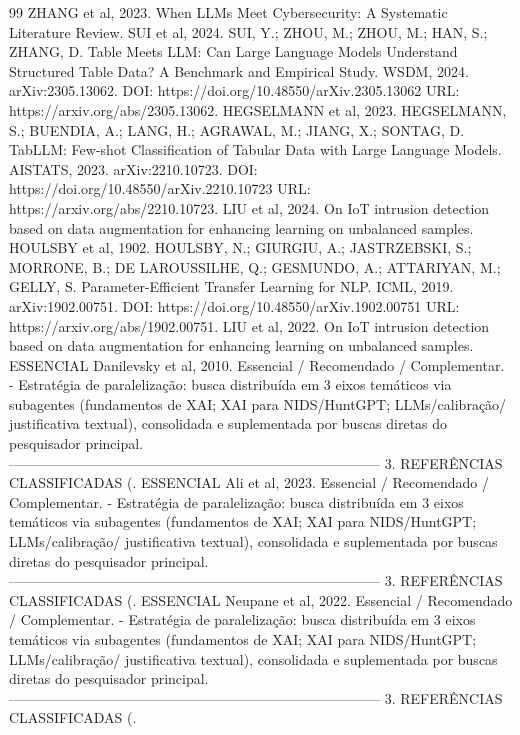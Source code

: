 \documentclass[12pt,a4paper]{article}
\begin{document}
\begin{thebibliography}{99}
 ZHANG et al, 2023. When LLMs Meet Cybersecurity: A Systematic Literature Review.
 SUI et al, 2024. SUI, Y.; ZHOU, M.; ZHOU, M.; HAN, S.; ZHANG, D. Table Meets LLM: Can Large Language Models Understand Structured Table Data? A Benchmark and Empirical Study. WSDM, 2024. arXiv:2305.13062. DOI: https://doi.org/10.48550/arXiv.2305.13062 URL: https://arxiv.org/abs/2305.13062.
 HEGSELMANN et al, 2023. HEGSELMANN, S.; BUENDIA, A.; LANG, H.; AGRAWAL, M.; JIANG, X.; SONTAG, D. TabLLM: Few-shot Classification of Tabular Data with Large Language Models. AISTATS, 2023. arXiv:2210.10723. DOI: https://doi.org/10.48550/arXiv.2210.10723 URL: https://arxiv.org/abs/2210.10723.
 LIU et al, 2024. On IoT intrusion detection based on data augmentation for enhancing learning on unbalanced samples.
 HOULSBY et al, 1902. HOULSBY, N.; GIURGIU, A.; JASTRZEBSKI, S.; MORRONE, B.; DE LAROUSSILHE, Q.; GESMUNDO, A.; ATTARIYAN, M.; GELLY, S. Parameter-Efficient Transfer Learning for NLP. ICML, 2019. arXiv:1902.00751. DOI: https://doi.org/10.48550/arXiv.1902.00751 URL: https://arxiv.org/abs/1902.00751.
 LIU et al, 2022. On IoT intrusion detection based on data augmentation for enhancing learning on unbalanced samples.
 ESSENCIAL Danilevsky et al, 2010. Essencial / Recomendado / Complementar. - Estratégia de paralelização: busca distribuída em 3 eixos temáticos via subagentes (fundamentos de XAI; XAI para NIDS/HuntGPT; LLMs/calibração/ justificativa textual), consolidada e suplementada por buscas diretas do pesquisador principal. -------------------------------------------------------------------------------- 3. REFERÊNCIAS CLASSIFICADAS (.
 ESSENCIAL Ali et al, 2023. Essencial / Recomendado / Complementar. - Estratégia de paralelização: busca distribuída em 3 eixos temáticos via subagentes (fundamentos de XAI; XAI para NIDS/HuntGPT; LLMs/calibração/ justificativa textual), consolidada e suplementada por buscas diretas do pesquisador principal. -------------------------------------------------------------------------------- 3. REFERÊNCIAS CLASSIFICADAS (.
 ESSENCIAL Neupane et al, 2022. Essencial / Recomendado / Complementar. - Estratégia de paralelização: busca distribuída em 3 eixos temáticos via subagentes (fundamentos de XAI; XAI para NIDS/HuntGPT; LLMs/calibração/ justificativa textual), consolidada e suplementada por buscas diretas do pesquisador principal. -------------------------------------------------------------------------------- 3. REFERÊNCIAS CLASSIFICADAS (.

\end{thebibliography}
\end{document}
